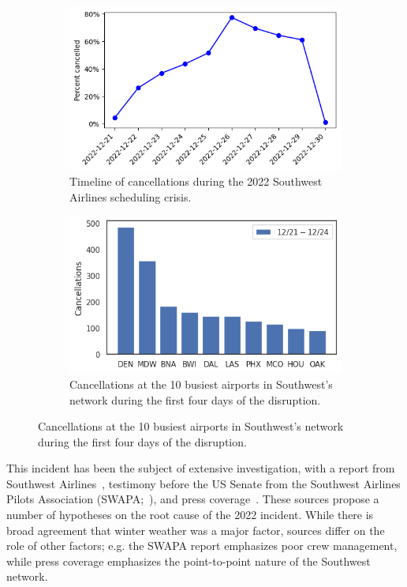 \begin{figure}[tb]
    \centering
    \begin{subfigure}[t]{0.45\linewidth}
        \includegraphics[width=\linewidth]{images/icml/wn/wn_cancellations.png}
        \caption{Timeline of cancellations during the 2022 Southwest Airlines scheduling crisis.}
        \label{ch:icml:fig:wn_cancellations:timeline}
    \end{subfigure}
    \begin{subfigure}[t]{0.45\linewidth}
        \includegraphics[width=\linewidth]{images/icml/wn/wn_cancellations_by_origin.png}
        \caption{Cancellations at the 10 busiest airports in Southwest's network during the first four days of the disruption.}
        \label{ch:icml:fig:wn_cancellations:cancellations}
    \end{subfigure}
\end{figure}

This incident has been the subject of extensive investigation, with a report from Southwest Airlines~\cite{southwestairlinesFinalSummaryAction2023}, testimony before the US Senate from the Southwest Airlines Pilots Association (SWAPA;~\cite{MurrayTestimony}), and press coverage~\cite{roseSouthwestWillPay2023,cramerWhatCausedChaos2022}. These sources propose a number of hypotheses on the root cause of the 2022 incident. While there is broad agreement that winter weather was a major factor, sources differ on the role of other factors; e.g. the SWAPA report emphasizes poor crew management, while press coverage emphasizes the point-to-point nature of the Southwest network.

